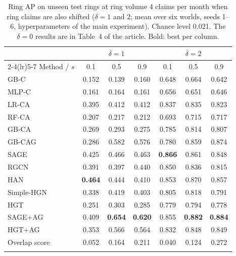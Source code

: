 \documentclass[pdflatex,sn-vancouver-num]{sn-jnl}
\newcommand{\MainTabLowVolume}{4}
\begin{document}
\begin{table}[h]
\caption{Ring AP on unseen test rings at ring volume 4 claims per month when ring claims are also shifted ($\delta=1$ and $2$; mean over six worlds, seeds 1--6, hyperparameters of the main experiment). Chance level 0.021. The $\delta=0$ results are in Table~\MainTabLowVolume{} of the article. Bold: best per column.}\label{tab:lowvolume_shift}
\scriptsize
\setlength{\tabcolsep}{3.5pt}
\begin{tabular}{@{}lcccccc@{}}
\toprule
 & \multicolumn{3}{c}{$\delta=1$} & \multicolumn{3}{c}{$\delta=2$} \\
\cmidrule(lr){2-4}\cmidrule(lr){5-7}
Method / $s$ & 0.1 & 0.5 & 0.9 & 0.1 & 0.5 & 0.9 \\
\midrule
GB-C & 0.152 & 0.139 & 0.160 & 0.648 & 0.664 & 0.642 \\
MLP-C & 0.161 & 0.164 & 0.161 & 0.656 & 0.651 & 0.646 \\
LR-CA & 0.395 & 0.412 & 0.412 & 0.837 & 0.835 & 0.823 \\
RF-CA & 0.207 & 0.217 & 0.212 & 0.693 & 0.715 & 0.717 \\
GB-CA & 0.269 & 0.293 & 0.275 & 0.785 & 0.814 & 0.807 \\
GB-CAG & 0.286 & 0.582 & 0.576 & 0.780 & 0.859 & 0.874 \\
\midrule
SAGE & 0.425 & 0.466 & 0.463 & \textbf{0.866} & 0.861 & 0.848 \\
RGCN & 0.391 & 0.397 & 0.440 & 0.850 & 0.836 & 0.815 \\
HAN & \textbf{0.464} & 0.444 & 0.410 & 0.853 & 0.870 & 0.857 \\
Simple-HGN & 0.338 & 0.419 & 0.403 & 0.805 & 0.818 & 0.791 \\
HGT & 0.251 & 0.303 & 0.285 & 0.779 & 0.794 & 0.778 \\
\midrule
SAGE+AG & 0.409 & \textbf{0.654} & \textbf{0.620} & 0.855 & \textbf{0.882} & \textbf{0.884} \\
HGT+AG & 0.353 & 0.566 & 0.564 & 0.832 & 0.848 & 0.849 \\
Overlap score & 0.052 & 0.164 & 0.211 & 0.040 & 0.124 & 0.272 \\
\botrule
\end{tabular}
\end{table}
\end{document}
